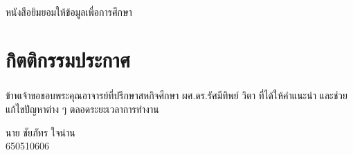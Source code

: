 \documentclass[a4paper,12pt]{report}
\newcommand{\thaipagenum}{
  \ifcase\value{page}
    \or ก%
    \or ข%
    \or ค%
    \or ง%
    \or จ%
    \or ฉ%
    \or ช%
    \or ซ%
    \or ฌ%
    \else หน้า~\thepage %
  \fi
}
\begin{document}
\newpage
\clearpage
\thispagestyle{empty}
\setcounter{page}{0}
หนังสือยิมยอมให้ข้อมูลเพื่อการศึกษา

\newpage
\clearpage
\renewcommand{\thepage}{\thaipagenum}
\setcounter{page}{1}

\chapter*{กิตติกรรมประกาศ}
\paragraph{} ข้าพเจ้าขอขอบพระคุณอาจารย์ที่ปรึกษาสหกิจศึกษา ผศ.ดร.รัศมีทิพย์ วิตา ที่ได้ให้คำแนะนำ
และช่วยแก้ไขปัญหาต่าง ๆ ตลอดระยะเวลาการทำงาน
\begin{flushright}
    นาย ชัยภัทร ใจน่าน\\
    650510606
\end{flushright}
\end{document}
